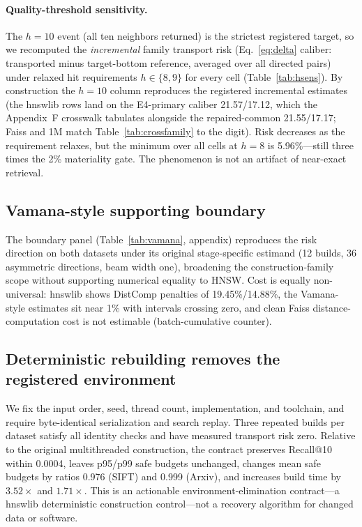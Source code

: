 \documentclass{article}
\begin{document}
\paragraph{Quality-threshold sensitivity.}
The $h{=}10$ event (all ten neighbors returned) is the strictest registered target, so we recomputed the
\emph{incremental} family transport risk (Eq.~\ref{eq:delta} caliber: transported minus target-bottom
reference, averaged over all directed pairs) under relaxed hit requirements $h\in\{8,9\}$ for every cell
(Table~\ref{tab:hsens}). By construction the $h{=}10$ column reproduces the registered incremental
estimates (the hnswlib rows land on the E4-primary caliber 21.57/17.12, which the Appendix~F crosswalk
tabulates alongside the repaired-common 21.55/17.17; Faiss and 1M match Table~\ref{tab:crossfamily} to
the digit). Risk decreases as the requirement relaxes, but the minimum over all cells at $h{=}8$ is
5.96\%---still three times the 2\% materiality gate. The phenomenon is not an artifact of near-exact
retrieval.

\subsection{Vamana-style supporting boundary}

The boundary panel (Table~\ref{tab:vamana}, appendix) reproduces the risk direction on both datasets under
its original stage-specific estimand (12 builds, 36 asymmetric directions, beam width one), broadening the
construction-family scope without supporting numerical equality to HNSW. Cost is equally non-universal:
hnswlib shows DistComp penalties of 19.45\%/14.88\%, the Vamana-style estimates sit near 1\% with
intervals crossing zero, and clean Faiss distance-computation cost is not estimable (batch-cumulative
counter).

\subsection{Deterministic rebuilding removes the registered environment}
\label{sec:contract}

We fix the input order, seed, thread count, implementation, and toolchain, and require byte-identical
serialization and search replay. Three repeated builds per dataset satisfy all identity checks and have
measured transport risk zero. Relative to the original multithreaded construction, the contract preserves
Recall@10 within 0.0004, leaves p95/p99 safe budgets unchanged, changes mean safe budgets by ratios 0.976
(SIFT) and 0.999 (Arxiv), and increases build time by $3.52\times$ and $1.71\times$. This is an actionable
environment-elimination contract---a hnswlib deterministic construction control---not a recovery algorithm
for changed data or software.
\end{document}
